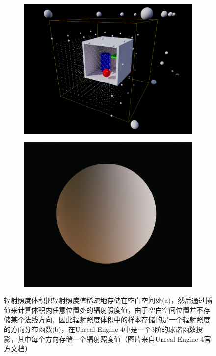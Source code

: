 \begin{figure}
	\begin{subfigure}[b]{0.5265\textwidth}
		\includegraphics[width=\textwidth]{figures/pl/VLM_Placement}
		\caption{}
	\end{subfigure}
	\begin{subfigure}[b]{0.4735\textwidth}
		\includegraphics[width=\textwidth]{figures/pl/VolumeLightmap}
			\caption{}
	\end{subfigure}
	\caption{辐射照度体积把辐射照度值稀疏地存储在空白空间处(a)，然后通过插值来计算体积内任意位置处的辐射照度值，由于空白空间位置并不存储某个法线方向，因此辐射照度体积中的样本存储的是一个辐射照度的方向分布函数(b)，在Unreal Engine 4中是一个3阶的球谐函数投影，其中每个方向存储一个辐射照度值（图片来自Unreal Engine 4官方文档）}
	\label{f:pl-irradiance-volume}
\end{figure}

